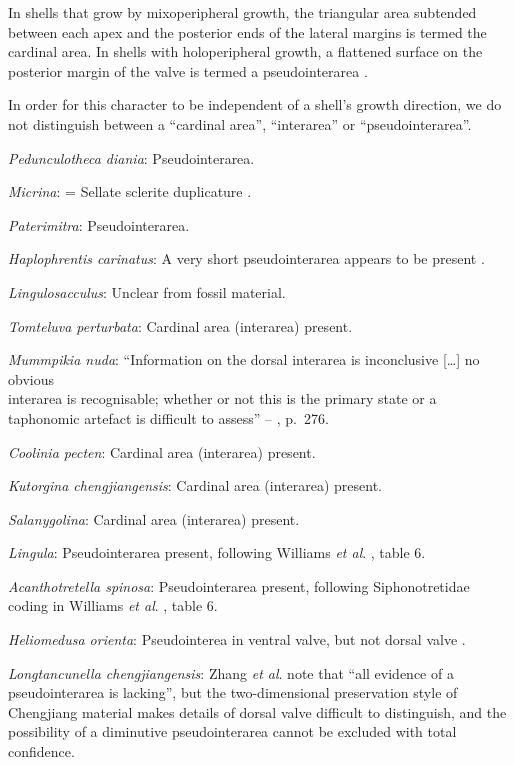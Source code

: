 \documentclass[]{book}
\theoremstyle{definition}
\theoremstyle{definition}
\theoremstyle{definition}
\theoremstyle{remark}
\begin{document}
In shells that grow by mixoperipheral growth, the triangular area
subtended between each apex and the posterior ends of the lateral
margins is termed the cardinal area. In shells with holoperipheral
growth, a flattened surface on the posterior margin of the valve is
termed a pseudointerarea
\citep[paraphrasing][]{Williams1997BrachiopodaRevised}.

In order for this character to be independent of a shell's growth
direction, we do not distinguish between a ``cardinal area'',
``interarea'' or ``pseudointerarea''.

\emph{Pedunculotheca diania}: Pseudointerarea.

\emph{Micrina}: = Sellate sclerite duplicature
\citep{Holmer2008TheEarly}.

\emph{Paterimitra}: Pseudointerarea.

\emph{Haplophrentis carinatus}: A very short pseudointerarea appears to
be present \citep{Moysiuk2017Hyolithsare}.

\emph{Lingulosacculus}: Unclear from fossil material.

\emph{Tomteluva perturbata}: Cardinal area (interarea) present.

\emph{Mummpikia nuda}: ``Information on the dorsal interarea is
inconclusive {[}\ldots{}{]} no obvious\\
interarea is recognisable; whether or not this is the primary state or a
taphonomic artefact is difficult to assess'' --
\citet{Balthasar2008iMummpikia}, p.~276.

\emph{Coolinia pecten}: Cardinal area (interarea) present.

\emph{Kutorgina chengjiangensis}: Cardinal area (interarea) present.

\emph{Salanygolina}: Cardinal area (interarea) present.

\emph{Lingula}: Pseudointerarea present, following Williams \emph{et
al}. \citeyearpar{Williams2000BrachiopodaLinguliformea}, table 6.

\emph{Acanthotretella spinosa}: Pseudointerarea present, following
Siphonotretidae coding in Williams \emph{et al}.
\citeyearpar{Williams2000BrachiopodaLinguliformea}, table 6.

\emph{Heliomedusa orienta}: Pseudointerea in ventral valve, but not
dorsal valve \citep[2007]{Williams2000BrachiopodaLinguliformea}.

\emph{Longtancunella chengjiangensis}: Zhang \emph{et al}.
\citeyearpar{Zhang2011Theexceptionally} note that ``all evidence of a
pseudointerarea is lacking'', but the two-dimensional preservation style
of Chengjiang material makes details of dorsal valve difficult to
distinguish, and the possibility of a diminutive pseudointerarea cannot
be excluded with total confidence.
\end{document}
